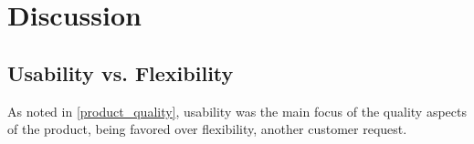 \chapter{Discussion}

\section{Usability vs. Flexibility}
As noted in \autoref{product_quality}, usability was the main focus of the quality aspects of the product, being favored over flexibility, another customer request. 
